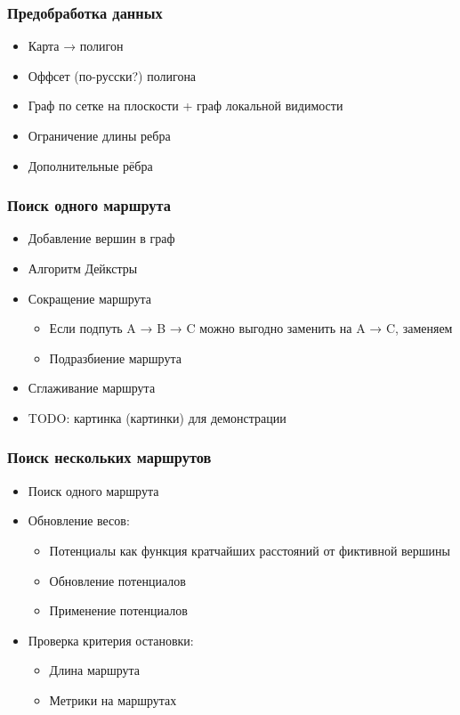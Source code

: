 \documentclass[mathserif]{beamer}
\begin{document}
\begin{frame}
    \frametitle{Предобработка данных}
    \begin{itemize}
        \item Карта → полигон
        \item Оффсет (по-русски?) полигона
        \item Граф по сетке на плоскости + граф локальной видимости
        \item Ограничение длины ребра
        \item Дополнительные рёбра
    \end{itemize}
\end{frame}

\begin{frame}
    \frametitle{Поиск одного маршрута}
    \begin{itemize}
        \item Добавление вершин в граф
        \item Алгоритм Дейкстры
        \item Сокращение маршрута
        \begin{itemize}
            \item Если подпуть A → B → C можно выгодно заменить на A → C, заменяем 
            \item Подразбиение маршрута
        \end{itemize}
        \item Сглаживание маршрута
        \item TODO: картинка (картинки) для демонстрации
    \end{itemize}
\end{frame}

\begin{frame}
    \frametitle{Поиск нескольких маршрутов}
    \begin{itemize}
        \item Поиск одного маршрута
        \item Обновление весов:
        \begin{itemize}
            \item Потенциалы как функция кратчайших расстояний от фиктивной вершины 
            \item Обновление потенциалов
            \item Применение потенциалов
        \end{itemize}
        \item Проверка критерия остановки:
        \begin{itemize}
            \item Длина маршрута
            \item Метрики на маршрутах
        \end{itemize}
    \end{itemize}
\end{frame}
\end{document}
